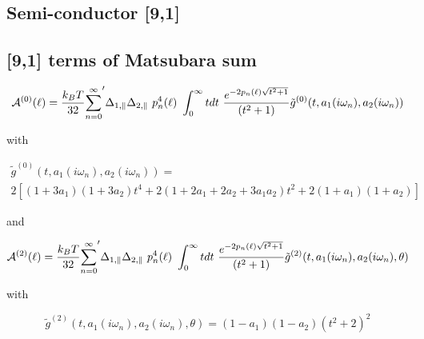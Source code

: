 \documentclass[a4paper]{article}
\begin{document}
\begin{center}
\section{Semi-conductor [9,1]}
\subsection{[9,1] terms of Matsubara sum}
\begin{equation}
{\cal A}^{(0)}(\ell) = \frac{k_BT}{32}  {\sum_{n=0}^{\infty}}' \Delta_{1,\parallel} \Delta_{2,\parallel} ~p_n^{4}(\ell) ~\int_0^{\infty} t dt ~\frac{e^{- 2 p_n(\ell) \sqrt{t^{2} + 1}}}{(t^{2} + 1)} \tilde g^{(0)}(t, a_1(i \omega_n), a_2(i \omega_n))
\end{equation}

with

\begin{multline*}
\tilde g^{(0)}(t, a_1(i \omega_n), a_2(i \omega_n)) = \\ 
2 \left[ (1+3a_1)(1+3a_2) t^{4} + 2 (1+2a_1+2a_2+3a_1a_2) t^{2}  + 2(1+a_1)(1+a_2)\right]
\end{multline*}


and

\begin{equation}
{\cal A}^{(2)}(\ell) = \frac{k_BT}{32}  {\sum_{n=0}^{\infty}}' \Delta_{1,\parallel} \Delta_{2,\parallel} ~p_n^{4}(\ell) ~\int_0^{\infty} t dt ~\frac{e^{- 2 p_n(\ell) \sqrt{t^{2} + 1}}}{(t^{2} + 1)} \tilde g^{(2)}(t, a_1(i \omega_n), a_2(i \omega_n), \theta)
\end{equation}

with

\begin{equation}
\tilde g^{(2)}(t, a_1(i \omega_n), a_2(i \omega_n), \theta) = (1-a_1)(1-a_2)(t^{2} + 2)^2
\label{befgqw}
\end{equation}



\end{center}
\end{document}
